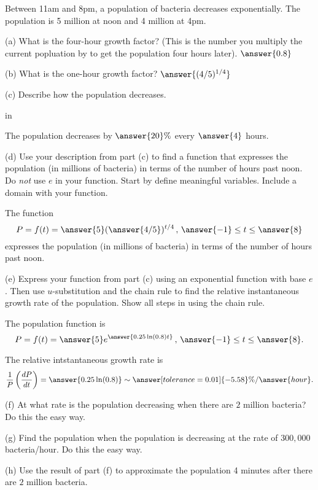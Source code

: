\documentclass{ximera}
\newcommand{\pskip}{\vskip 0.1 in}
\begin{document}
\begin{question}  \label{Q234gt44}
Between 11am and 8pm, a population of bacteria decreases exponentially. The population is 5 million at noon and 4 million at 4pm.

(a) What is the four-hour growth factor? (This is the number you multiply the current popluation by to get the population four hours later). $\answer{0.8}$

(b) What is the one-hour growth factor? $\answer{(4/5)^{1/4}}$

(c) Describe how the population decreases.

\pskip

The population decreases by $\answer{20}\%$ every $\answer{4}$ hours.


(d) Use your description from part (c) to find a function that expresses the population (in millions of bacteria) in terms of the number of hours past noon. Do \emph{not} use $e$ in your function. Start by define meaningful variables. Include a domain with your function.

The function 
\[
  P= f(t) = \answer{5}(\answer{4/5})^{t/4} \, , \, \answer{-1} \leq t \leq \answer{8}
\]
expresses the population (in millions of bacteria) in terms of the number of hours past noon.

(e) Express your function from part (c) using an exponential function with base $e$. Then use $u$-substitution and the chain rule to find the relative instantaneous growth rate of the population. Show all steps in using the chain rule.

The population function is
\[
      P= f(t) = \answer{5}e^{\answer{0.25\ln(0.8) t}} \, , \, \answer{-1} \leq t \leq \answer{8} .
\]

The relative intstantaneous growth rate is
\[
      \frac{1}{P}\left(  \frac{dP}{dt}  \right) = \answer{0.25 \ln(0.8)} \sim \answer[tolerance=0.01]{-5.58}\%/\answer{hour} .
\]


(f) At what rate is the population decreasing when there are $2$ million bacteria? Do this the easy way.

(g) Find the population when the population is decreasing at the rate of $300,000$ bacteria/hour. Do this the easy way.

(h) Use the result of part (f) to approximate the population 4 minutes after there are $2$ million bacteria.


\end{question}
\end{document}
